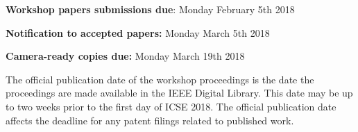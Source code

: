 \documentclass[sigconf]{acmart}
\begin{document}
\textbf{Workshop papers submissions due}: Monday February 5th 2018

\textbf{Notification to accepted papers:} Monday March 5th 2018

\textbf{Camera-ready copies due:} Monday March 19th 2018

\vspace{0.2cm}

The official publication date of the workshop proceedings is the date the proceedings are made available in the IEEE Digital Library. This date may be up to two weeks prior to the first day of ICSE 2018. The official publication date affects the deadline for any patent filings related to published work.
\end{document}
